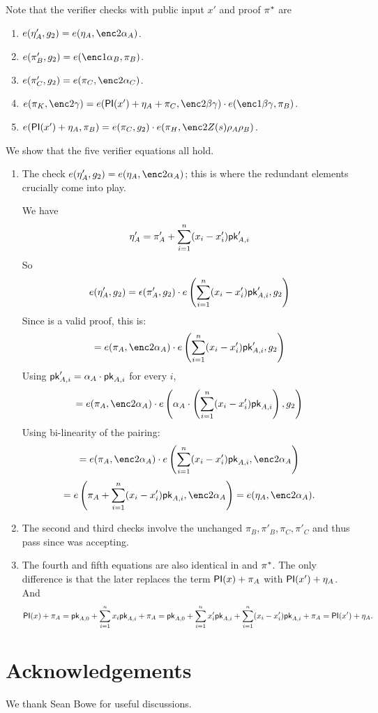 \documentclass[11pt]{article}
\numberwithin{equation}{section} %
\numberwithin{figure}{section} %
\newcommand{\eps}{\epsilon}
\newcommand{\e}{\eps}
\begin{document}
 Note that the verifier checks with public input $x'$ and proof $\pi^*$ are
\begin{enumerate}
 \item $e(\eta'_A,g_2)=e(\eta_A,\enc2{\alpha_A})$.
\item $e(\pi'_B, g_2)=e(\enc1{\alpha_B},\pi_B)$.
\item $e(\pi'_C,g_2)=e(\pi_C,\enc2{\alpha_C})$.
\item $e(\pi_K,\enc2{\gamma})=e(\PI(x')+\eta_A+\pi_C,\enc2{\beta\gamma})\cdot e(\enc1{\beta\gamma},\pi_B)$.
\item $e(\PI(x')+\eta_A,\pi_B)= e(\pi_C,g_2)\cdot e(\pi_H,\enc2{Z(s)\rho_A\rho_B})$.
 \end{enumerate}
 
 
 We show that the five verifier equations all hold.
 \begin{enumerate}
  \item The check  $e(\eta'_A,g_2)=e(\eta_A,\enc2{\alpha_A})$;
  this is where the redundant elements crucially come into play.
  
  
  We have
  \[\eta'_A = \pi'_A + \sum_{i=1}^n (x_i-x'_i) \mathsf{pk}'_{A,i}\]
 So
 \[e(\eta'_A,g_2) = \e(\pi'_A,g_2)\cdot e\left(\sum_{i=1}^n (x_i-x'_i) \pk'_{A,i},g_2\right)\]
 Since \prf is a valid proof, this is:
  \[=e(\pi_A,\enc2{\alpha_A})\cdot e\left(\sum_{i=1}^n (x_i-x'_i) \pk'_{A,i},g_2\right)\]
  Using $\mathsf{pk}'_{A,i} = \alpha_A\cdot \mathsf{pk}_{A,i}$ for every $i$,
  \[=e(\pi_A,\enc2{\alpha_A})\cdot e\left(\alpha_A\cdot \left(\sum_{i=1}^n (x_i-x'_i) \pk_{A,i}\right),g_2\right)\]
Using bi-linearity of the pairing:
 \[=e(\pi_A,\enc2{\alpha_A})\cdot e\left(\sum_{i=1}^n (x_i-x'_i) \pk_{A,i},\enc2{\alpha_A}\right)\]
  \[=e\left(\pi_A+\sum_{i=1}^n (x_i-x'_i) \pk_{A,i},\enc2{\alpha_A}\right) = e(\eta_A,\enc2{\alpha_A}).\]
  \item The second and third checks involve the unchanged $\pi_B,\pi'_B,\pi_C,\pi'_C$
  and thus pass since \prf was accepting.
  \item The fourth and fifth equations are also identical in \prf and $\pi^*$.
  The only difference is that the later replaces the term $\mathsf{PI}(x) + \pi_A$ 
  with $\mathsf{PI}(x')+ \eta_A$. And 
    \[\mathsf{PI}(x) + \pi_A = \mathsf{pk}_{A,0} + \sum_{i=1}^n x_i\mathsf{pk}_{A,i} + \pi_A = 
  \mathsf{pk}_{A,0} + \sum_{i=1}^n x'_i\mathsf{pk}_{A,i} +  \sum_{i=1}^n (x_i-x'_i) \mathsf{pk}_{A,i}  + \pi_A =
  \mathsf{PI}(x') + \eta_A.
  \]

 \end{enumerate}

 

\section*{Acknowledgements}
We thank Sean Bowe for useful discussions.


\end{document}
